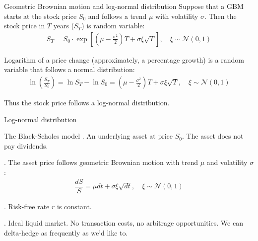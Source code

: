 \documentclass{beamer}
\begin{document}
\begin{frame}{Geometric Brownian motion and log-normal distribution}
\justify
Suppose that a GBM starts at the stock price $S_0$ and follows a trend $\mu$ with volatility $\sigma$. Then the stock price in $T$ years ($S_T$) is random variable:
\begin{align*}
S_T = S_0\cdot \exp\left[\left(\mu - \frac{\sigma^2}{2}\right)T + \sigma\xi\sqrt{T}\right], \quad \xi \sim \mathcal{N}(0, 1)
\end{align*} 

\justify
Logarithm of a price change (approximately, a percentage growth) is a random variable that follows a normal distribution:
\begin{align*}
\ln\left(\frac{S_T}{S_0}\right) = \ln S_T - \ln S_0 = \left(\mu - \frac{\sigma^2}{2}\right)T + \sigma\xi\sqrt{T}, \quad \xi \sim \mathcal{N}(0, 1)
\end{align*}

\justify
Thus the stock price follows a log-normal distribution.
\end{frame}



\begin{frame}{Log-normal distribution}
\centering
{}
\end{frame}



\begin{frame}{The Black-Scholes model}
. An underlying asset at price $S_0$. The asset does not pay dividends.

. The asset price follows geometric Brownian motion with trend $\mu$ and volatility $\sigma$:
\begin{align*}
\dfrac{dS}{S} = \mu dt + \sigma\xi\sqrt{dt}, \quad \xi \sim \mathcal{N}(0,1)
\end{align*}

. Risk-free rate $r$ is constant.

. Ideal liquid market. No transaction costs, no arbitrage opportunities. We can delta-hedge as frequently as we'd like to.
\end{frame}
\end{document}

